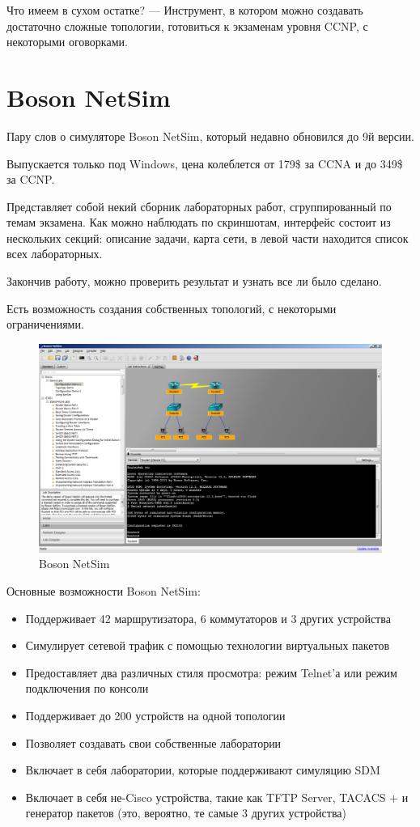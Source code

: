 \documentclass[a4paper,14pt]{extreport}
\begin{document}
	
	Что имеем в сухом остатке?
	— Инструмент, в котором можно создавать достаточно сложные топологии, готовиться к экзаменам уровня CCNP, с некоторыми оговорками.
	
	\section{Boson NetSim}
	
	Пару слов о симуляторе Boson NetSim, который недавно обновился до 9й версии.
	
	
	
	Выпускается только под Windows, цена колеблется от 179\$ за CCNA и до 349\$ за CCNP.
	
	Представляет собой некий сборник лабораторных работ, сгруппированный по темам экзамена.
	Как можно наблюдать по скриншотам, интерфейс состоит из нескольких секций: описание задачи, карта сети, в левой части находится список всех лабораторных.
	
	Закончив работу, можно проверить результат и узнать все ли было сделано.
	
	Есть возможность создания собственных топологий, с некоторыми ограничениями.
	
	
	\begin{figure}[h!]
	\centering
	\includegraphics[width=0.9\linewidth]{pic/netsim}
	\caption{Boson NetSim}
	\label{fig:netsim}
	\end{figure}
		
	Основные возможности Boson NetSim:
	
	\begin{itemize}
		\item Поддерживает 42 маршрутизатора, 6 коммутаторов и 3 других устройства
		\item Симулирует сетевой трафик с помощью технологии виртуальных пакетов
		\item Предоставляет два различных стиля просмотра: режим Telnet'а или режим подключения по консоли
		\item Поддерживает до 200 устройств на одной топологии
		\item Позволяет создавать свои собственные лаборатории
		\item Включает в себя лаборатории, которые поддерживают симуляцию SDM
		\item Включает в себя не-Cisco устройства, такие как TFTP Server, TACACS + и генератор пакетов (это, вероятно, те самые 3 других устройства)
	\end{itemize}
	
\end{document}
